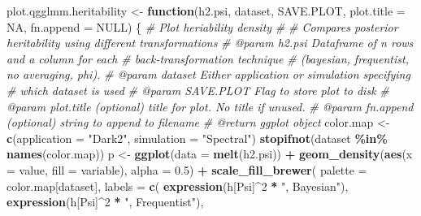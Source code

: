 \documentclass[
]{article}
\newenvironment{Shaded}{\begin{snugshade}}{\end{snugshade}}
\newcommand{\AttributeTok}[1]{\textcolor[rgb]{0.13,0.29,0.53}{#1}}
\newcommand{\CommentTok}[1]{\textcolor[rgb]{0.56,0.35,0.01}{\textit{#1}}}
\newcommand{\ConstantTok}[1]{\textcolor[rgb]{0.56,0.35,0.01}{#1}}
\newcommand{\ControlFlowTok}[1]{\textcolor[rgb]{0.13,0.29,0.53}{\textbf{#1}}}
\newcommand{\DecValTok}[1]{\textcolor[rgb]{0.00,0.00,0.81}{#1}}
\newcommand{\FloatTok}[1]{\textcolor[rgb]{0.00,0.00,0.81}{#1}}
\newcommand{\FunctionTok}[1]{\textcolor[rgb]{0.13,0.29,0.53}{\textbf{#1}}}
\newcommand{\NormalTok}[1]{#1}
\newcommand{\OtherTok}[1]{\textcolor[rgb]{0.56,0.35,0.01}{#1}}
\newcommand{\SpecialCharTok}[1]{\textcolor[rgb]{0.81,0.36,0.00}{\textbf{#1}}}
\newcommand{\StringTok}[1]{\textcolor[rgb]{0.31,0.60,0.02}{#1}}
\begin{document}
\begin{Shaded}
\begin{Highlighting}[]
\NormalTok{plot.qgglmm.heritability }\OtherTok{\textless{}{-}} \ControlFlowTok{function}\NormalTok{(h2.psi, dataset, SAVE.PLOT,}
                                     \AttributeTok{plot.title =} \ConstantTok{NA}\NormalTok{,}
                                     \AttributeTok{fn.append =} \ConstantTok{NULL}\NormalTok{) \{}
  \CommentTok{\#\textquotesingle{} Plot heriability density}
  \CommentTok{\#\textquotesingle{}}
  \CommentTok{\#\textquotesingle{} Compares posterior heritability using different transformations}
  \CommentTok{\#\textquotesingle{} @param h2.psi Dataframe of n rows and a column for each}
  \CommentTok{\#\textquotesingle{} back{-}transformation technique}
  \CommentTok{\#\textquotesingle{} (bayesian, frequentist, no averaging, phi).}
  \CommentTok{\#\textquotesingle{} @param dataset Either \textquotesingle{}application\textquotesingle{} or \textquotesingle{}simulation\textquotesingle{} specifying}
  \CommentTok{\#\textquotesingle{} which dataset is used}
  \CommentTok{\#\textquotesingle{} @param SAVE.PLOT Flag to store plot to disk}
  \CommentTok{\#\textquotesingle{} @param plot.title (optional) title for plot. No title if unused.}
  \CommentTok{\#\textquotesingle{} @param fn.append (optional) string to append to filename}
  \CommentTok{\#\textquotesingle{} @return ggplot object}
\NormalTok{  color.map }\OtherTok{\textless{}{-}} \FunctionTok{c}\NormalTok{(}\AttributeTok{application =} \StringTok{"Dark2"}\NormalTok{, }\AttributeTok{simulation =} \StringTok{"Spectral"}\NormalTok{)}
  \FunctionTok{stopifnot}\NormalTok{(dataset }\SpecialCharTok{\%in\%} \FunctionTok{names}\NormalTok{(color.map))}
\NormalTok{  p }\OtherTok{\textless{}{-}} \FunctionTok{ggplot}\NormalTok{(}\AttributeTok{data =} \FunctionTok{melt}\NormalTok{(h2.psi)) }\SpecialCharTok{+}
    \FunctionTok{geom\_density}\NormalTok{(}\FunctionTok{aes}\NormalTok{(}\AttributeTok{x =}\NormalTok{ value, }\AttributeTok{fill =}\NormalTok{ variable), }\AttributeTok{alpha =} \FloatTok{0.5}\NormalTok{) }\SpecialCharTok{+}
    \FunctionTok{scale\_fill\_brewer}\NormalTok{(}
      \AttributeTok{palette =}\NormalTok{ color.map[dataset],}
      \AttributeTok{labels =} \FunctionTok{c}\NormalTok{(}
        \FunctionTok{expression}\NormalTok{(h[Psi]}\SpecialCharTok{\^{}}\DecValTok{2} \SpecialCharTok{*} \StringTok{", Bayesian"}\NormalTok{),}
        \FunctionTok{expression}\NormalTok{(h[Psi]}\SpecialCharTok{\^{}}\DecValTok{2} \SpecialCharTok{*} \StringTok{", Frequentist"}\NormalTok{),}

\end{Highlighting}
\end{Shaded}
\end{document}
